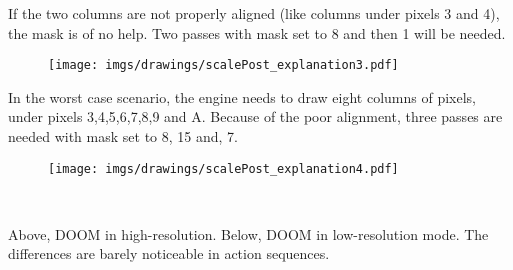 \label{simd_vga}
If the two columns are not properly aligned (like columns under pixels 3 and 4), the mask is of no help. Two passes with mask set to 8 and then 1 will be needed.\\
 \par
 \begin{minipage}{\textwidth}

\end{minipage}
\par
\begin{figure}[H]
 \centering
 \texttt{[image: imgs/drawings/scalePost\_explanation3.pdf]}
 \end{figure}


In the worst case scenario, the engine needs to draw eight columns of pixels, under pixels 3,4,5,6,7,8,9 and A. Because of the poor alignment, three passes are needed with mask set to 8, 15 and, 7.\\
 \par

 \begin{minipage}{\textwidth}

\end{minipage}
\par

  \begin{figure}[H]
 \centering
 \texttt{[image: imgs/drawings/scalePost\_explanation4.pdf]}
 \end{figure}


% 
 \par
 \\
\par
\vspace{-5pt}
\par
\vspace{-5pt}
Above, DOOM in high-resolution. Below, DOOM in low-resolution mode. The differences are barely noticeable in action sequences.\\
\par
\vspace{-5pt}





